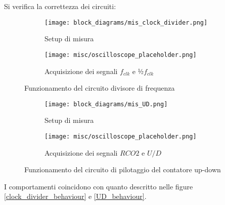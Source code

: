 Si verifica la correttezza dei circuiti:

\begin{figure}[H]
    \centering

    \begin{subfigure}{.5\textwidth}
        \centering
        \texttt{[image: block\_diagrams/mis\_clock\_divider.png]}
        \caption{Setup di misura}
        \label{mis_clock_divider}
    \end{subfigure}%
    \begin{subfigure}{.5\textwidth}
        \centering
        \texttt{[image: misc/oscilloscope\_placeholder.png]}
        \caption{Acquisizione dei segnali $f_{clk}$ e ½$f_{clk}$}
        \label{acq_clock_divider}
    \end{subfigure}

    \caption{Funzionamento del circuito divisore di frequenza}
    \label{clock_divider}
\end{figure}

\begin{figure}[H]
    \centering

    \begin{subfigure}{.5\textwidth}
        \centering
        \texttt{[image: block\_diagrams/mis\_UD.png]}
        \caption{Setup di misura}
        \label{mis_UD}
    \end{subfigure}%
    \begin{subfigure}{.5\textwidth}
        \centering
        \texttt{[image: misc/oscilloscope\_placeholder.png]}
        \caption{Acquisizione dei segnali $RCO2$ e $U/D$}
        \label{acq_UD}
    \end{subfigure}

    \caption{Funzionamento del circuito di pilotaggio del contatore up-down}
    \label{UD}
\end{figure}

I comportamenti coincidono con quanto descritto nelle figure \ref{clock_divider_behaviour} e
\ref{UD_behaviour}.


